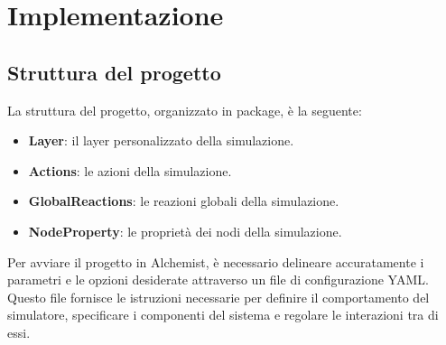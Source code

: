 \chapter{Implementazione}
\section{Struttura del progetto}
La struttura del progetto, organizzato in package, è la seguente:
\begin{itemize}
    \item \textbf{Layer}: il layer personalizzato della simulazione.
    \item \textbf{Actions}: le azioni della simulazione.
    \item \textbf{GlobalReactions}: le reazioni globali della simulazione.
    \item \textbf{NodeProperty}: le proprietà dei nodi della simulazione.
\end{itemize}
Per avviare il progetto in Alchemist, è necessario delineare accuratamente i parametri
e le opzioni desiderate attraverso un file di configurazione YAML\@. Questo file fornisce
le istruzioni necessarie per definire il comportamento del simulatore, specificare
i componenti del sistema e regolare le interazioni tra di essi.

